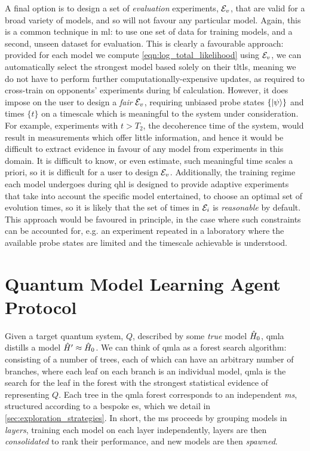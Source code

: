 A final option is to design a set of \emph{evaluation} experiments, ${ \mathcal{E} }_v$, 
    that are valid for a broad variety of models, and so will not favour any particular model.
Again, this is a common technique in \gls{ml}: to use one set of data for training models, 
    and a second, unseen dataset for evaluation. 
This is clearly a favourable approach: 
    provided for each model we compute \cref{eqn:log_total_likelihood} using ${ \mathcal{E} }_v$,
    we can automatically select the strongest model based solely on their \glspl{tltl}, 
    meaning we do not have to perform further computationally-expensive updates, 
    as required to cross-train on opponents' 
    experiments during \gls{bf} calculation. 
However, it does impose on the user to design a \emph{fair} ${ \mathcal{E} }_v$, 
    requiring unbiased probe states $\{\ket{\psi}\}$ and times $\{t\}$ on a timescale 
    which is meaningful to the system under consideration. 
For example, experiments with $t > T_2$, the decoherence time of the system, 
    would result in measurements which offer little information, 
    and hence it would be difficult to extract evidence in favour of any 
    model from experiments in this domain.
It is difficult to know, or even estimate, such meaningful time scales a priori,
    so it is difficult for a user to design ${ \mathcal{E} }_v$. 
Additionally, the training regime each model undergoes during \gls{qhl}
    is designed to provide adaptive experiments that take into account
    the specific model entertained, to choose an optimal set of evolution times, 
    so it is likely that the set of times in ${ \mathcal{E} }_i$ is \emph{reasonable} by default. 
This approach would be favoured in principle, in the case where such constraints can be accounted for,
    e.g. an experiment repeated in a laboratory where the available 
    probe states are limited and the timescale achievable is understood. 
     
\section{Quantum Model Learning Agent Protocol}\label{sec:qmla_protocol}
Given a target quantum system, $Q$, described by some \emph{true} model $\hat{H}_0$, 
    \gls{qmla} distills a model $\hat{H}^{\prime} \approx \hat{H}_0$.
We can think of \gls{qmla} as a forest search algorithm\footnotemark:
    consisting of a number of trees, each of which can have an arbitrary number of branches, 
    where each leaf on each branch is an individual model, 
    \gls{qmla} is the search for the leaf in the forest with the 
    strongest statistical evidence of representing $Q$. 
Each tree in the \gls{qmla} forest corresponds to an independent \emph{\gls{ms}}, 
    structured according to a bespoke \gls{es}, which we detail in \cref{sec:exploration_strategies}. 
In short, the \gls{ms} proceeds by grouping models in \emph{layers},
    training each model on each layer independently,
    layers are then \emph{consolidated} to rank their performance,
    and new models are then \emph{spawned}. 

